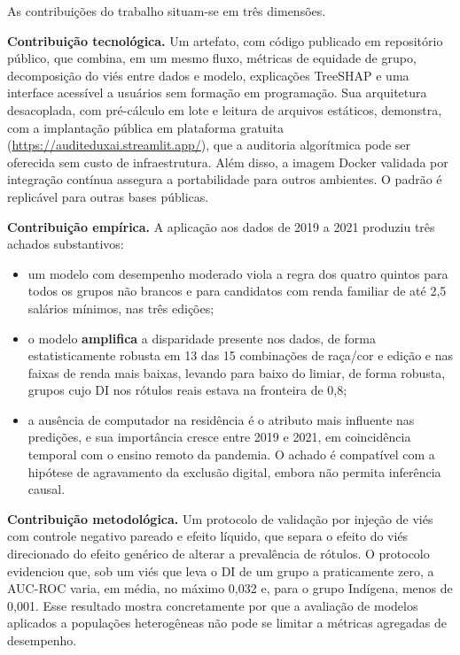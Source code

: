 As contribuições do trabalho situam-se em três dimensões.

\textbf{Contribuição tecnológica.} Um artefato, com código publicado em repositório público, que combina, em um mesmo fluxo, métricas de equidade de grupo, decomposição do viés entre dados e modelo, explicações TreeSHAP e uma interface acessível a usuários sem formação em programação. Sua arquitetura desacoplada, com pré-cálculo em lote e leitura de arquivos estáticos, demonstra, com a implantação pública em plataforma gratuita (\url{https://auditeduxai.streamlit.app/}), que a auditoria algorítmica pode ser oferecida sem custo de infraestrutura. Além disso, a imagem Docker validada por integração contínua assegura a portabilidade para outros ambientes. O padrão é replicável para outras bases públicas.

\textbf{Contribuição empírica.} A aplicação aos dados de 2019 a 2021 produziu três achados substantivos:
\begin{itemize}
    \item um modelo com desempenho moderado viola a regra dos quatro quintos para todos os grupos não brancos e para candidatos com renda familiar de até 2,5 salários mínimos, nas três edições;
    \item o modelo \textbf{amplifica} a disparidade presente nos dados, de forma estatisticamente robusta em 13 das 15 combinações de raça/cor e edição e nas faixas de renda mais baixas, levando para baixo do limiar, de forma robusta, grupos cujo DI nos rótulos reais estava na fronteira de 0,8;
    \item a ausência de computador na residência é o atributo mais influente nas predições, e sua importância cresce entre 2019 e 2021, em coincidência temporal com o ensino remoto da pandemia. O achado é compatível com a hipótese de agravamento da exclusão digital, embora não permita inferência causal.
\end{itemize}

\textbf{Contribuição metodológica.} Um protocolo de validação por injeção de viés com controle negativo pareado e efeito líquido, que separa o efeito do viés direcionado do efeito genérico de alterar a prevalência de rótulos. O protocolo evidenciou que, sob um viés que leva o DI de um grupo a praticamente zero, a AUC-ROC varia, em média, no máximo 0,032 e, para o grupo Indígena, menos de 0,001. Esse resultado mostra concretamente por que a avaliação de modelos aplicados a populações heterogêneas não pode se limitar a métricas agregadas de desempenho.

